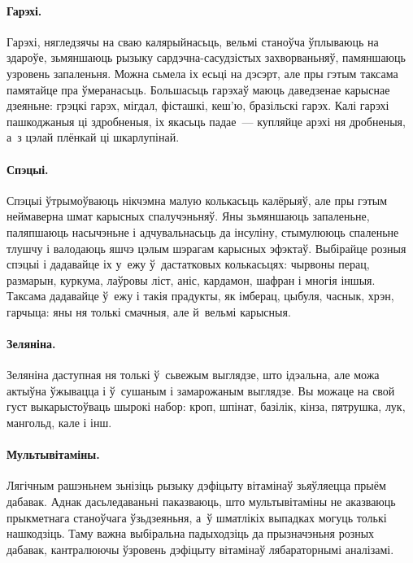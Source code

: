 \paragraph{Гарэхі.}
Гарэхі, нягледзячы на сваю калярыйнасьць, вельмі станоўча ўплываюць на здароўе, зьмяншаюць рызыку сардэчна-сасудзістых захворваньняў, памяншаюць узровень запаленьня. Можна сьмела іх есьці на дэсэрт, але пры гэтым таксама памятайце пра ўмеранасьць. Большасьць гарэхаў маюць даведзенае карыснае дзеяньне: грэцкі гарэх, мігдал, фісташкі, кеш'ю, бразільскі гарэх. Калі гарэхі пашкоджаныя ці здробненыя, іх якасьць падае~--- купляйце арэхі ня дробненыя, а~з цэлай плёнкай ці шкарлупінай.

\paragraph{Спэцыі.}
Спэцыі ўтрымоўваюць нікчэмна малую колькасьць калёрыяў, але пры гэтым неймаверна шмат карысных спалучэньняў. Яны зьмяншаюць запаленьне, паляпшаюць насычэньне і адчувальнасьць да інсуліну, стымулююць спаленьне тлушчу і валодаюць яшчэ цэлым шэрагам карысных эфэктаў. Выбірайце розныя спэцыі і дадавайце іх у~ежу ў~дастатковых колькасьцях: чырвоны перац, размарын, куркума, лаўровы ліст, аніс, кардамон, шафран і многія іншыя. Таксама дадавайце ў~ежу і такія прадукты, як імберац, цыбуля, часнык, хрэн, гарчыца: яны ня толькі смачныя, але й~вельмі карысныя.

\paragraph{Зеляніна.}
Зеляніна даступная ня толькі ў~сьвежым выглядзе, што ідэальна, але можа актыўна ўжывацца і ў~сушаным і замарожаным выглядзе. Вы можаце на свой густ выкарыстоўваць шырокі набор: кроп, шпінат, базілік, кінза, пятрушка, лук, мангольд, кале і інш.

\paragraph{Мультывітаміны.}
Лягічным рашэньнем зьнізіць рызыку дэфіцыту вітамінаў зьяўляецца прыём дабавак. Аднак дасьледаваньні паказваюць, што мультывітаміны не аказваюць прыкметнага станоўчага ўзьдзеяньня, а~ў шматлікіх выпадках могуць толькі нашкодзіць. Таму важна выбіральна падыходзіць да прызначэньня розных дабавак, кантралюючы ўзровень дэфіцыту вітамінаў лябараторнымі аналізамі.


